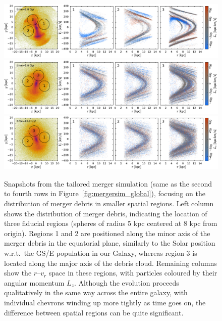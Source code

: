 \documentclass[a4paper,useAMS,usenatbib]{mnras}
\begin{document}
\begin{figure}
  \centering
  \includegraphics{img/mergersim_local1.pdf}
  \includegraphics{img/mergersim_local2.pdf}
  \includegraphics{img/mergersim_local3.pdf}
  \caption{
  Snapshots from the tailored merger simulation (same as the second to fourth rows in Figure~\ref{fig:mergersim_global}), focusing on the distribution of merger debris in smaller spatial regions. Left column shows the distribution of merger debris, indicating the location of three fiducial regions (spheres of radius 5 kpc centered at 8 kpc from origin). Regions 1 and 2 are positioned along the minor axis of the merger debris in the equatorial plane, similarly to the Solar position w.r.t.\ the GS/E population in our Galaxy, whereas region 3 is located along the major axis of the debris cloud. Remaining columns show the $r$--$v_r$ space in these regions, with particles coloured by their angular momentum $L_z$. Although the evolution proceeds qualitatively in the same way across the entire galaxy, with individual chevrons winding up more tightly as time goes on, the difference between spatial regions can be quite significant.
  }
  \label{fig:mergersim_local}
\end{figure}
\end{document}
